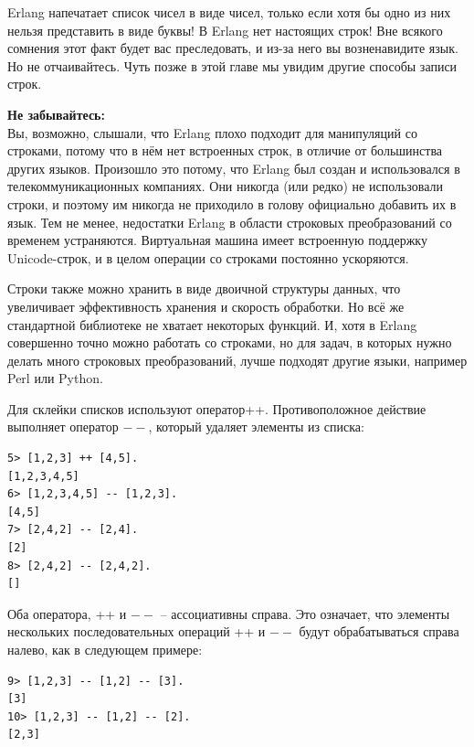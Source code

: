 \documentclass[a4paper,12pt]{report}
\newcommand{\ops}{\colorbox{lgreen}}
\begin{document}
Erlang напечатает список чисел в виде чисел, только если хотя бы одно из них нельзя представить в виде буквы! В Erlang нет настоящих строк! Вне всякого сомнения этот факт будет вас преследовать, и из\--за него вы возненавидите язык. Но не отчаивайтесь. Чуть позже в этой главе мы увидим другие способы записи строк.\\ 
\colorbox{lorange}
{
    \begin{minipage}{1.0\linewidth}
        \textbf{Не забывайтесь:}\\ 
        Вы, возможно, слышали, что Erlang плохо подходит для манипуляций со строками, потому что в нём нет встроенных строк, в отличие от большинства других языков. Произошло это потому, что Erlang был создан и использовался в телекоммуникационных компаниях. Они никогда (или редко) не использовали строки, и поэтому им никогда не приходило в голову официально добавить их в язык. Тем не менее, недостатки Erlang в области строковых преобразований со временем устраняются. Виртуальная машина имеет встроенную поддержку Unicode\--строк, и в целом операции со строками постоянно ускоряются.
        
        Строки также можно хранить в виде двоичной структуры данных, что увеличивает эффективность хранения и скорость обработки. Но всё же стандартной библиотеке не хватает некоторых функций. И, хотя в Erlang совершенно точно можно работать со строками, но для задач, в которых нужно делать много строковых преобразований, лучше подходят другие языки, например Perl или Python.
    \end{minipage}
}
Для склейки списков используют оператор\ops{++}. Противоположное действие выполняет оператор \ops{$--$}, который удаляет элементы из списка:
\begin{lstlisting}[style=repl]
5> [1,2,3] ++ [4,5].
[1,2,3,4,5]
6> [1,2,3,4,5] -- [1,2,3].
[4,5]
7> [2,4,2] -- [2,4].
[2]
8> [2,4,2] -- [2,4,2].
[]
\end{lstlisting}
Оба оператора, \ops{++} и \ops{$--$} \--- ассоциативны справа. Это означает, что элементы нескольких последовательных операций \ops{++} и \ops{$--$} будут обрабатываться справа налево, как в следующем примере:
\begin{lstlisting}[style=repl]
9> [1,2,3] -- [1,2] -- [3].
[3]
10> [1,2,3] -- [1,2] -- [2].
[2,3]
\end{lstlisting}
\end{document}
